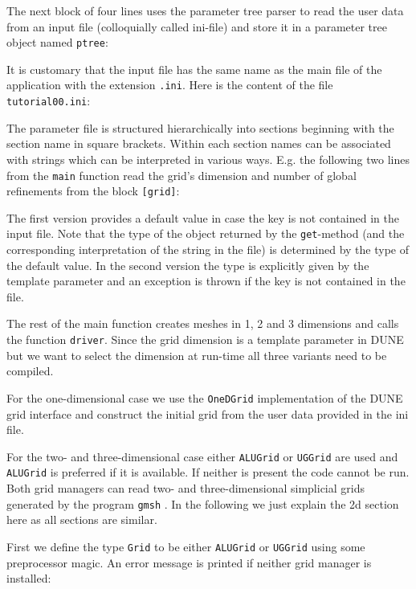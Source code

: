 \documentclass[a4paper,12pt]{article}
\begin{document}
The next block of four lines uses the parameter tree parser to
read the user data from an input file (colloquially called ini-file)
and store it in a parameter tree object
named \lstinline{ptree}:

It is customary that the input file has the same name as the 
main file of the application with the extension \lstinline{.ini}.
Here is the content of the file \lstinline{tutorial00.ini}:

The parameter file is structured hierarchically into 
sections beginning with the section name in square brackets.
Within each section names can be associated with strings which
can be interpreted in various ways. 
E.g. the following two lines from the \lstinline{main} function read the grid's
dimension and number of global refinements from the block \lstinline{[grid]}:

The first version provides a default value in case the key is not
contained in the input file. Note that the type of the object returned by the 
\lstinline{get}-method (and the corresponding interpretation of the string in the
file) is determined by the type of the default value. In the second version
the type is explicitly given by the template parameter and an exception
is thrown if the key is not contained in the file.

The rest of the main function creates meshes in 1, 2 and 3 dimensions
and calls the function \lstinline{driver}. Since the grid dimension is a template
parameter in DUNE but we want to select the dimension at run-time all three variants
need to be compiled. 

For the one-dimensional case we use the \lstinline{OneDGrid} implementation
of the DUNE grid interface and construct the initial grid from the user data
provided in the ini file.

For the two- and three-dimensional case either \lstinline{ALUGrid} or
\lstinline{UGGrid} are used and \lstinline{ALUGrid} is preferred if it is available. 
If neither is present the code cannot be run.
Both grid managers can read two- and three-dimensional simplicial
grids generated by the program \lstinline{gmsh} \cite{NME:NME2579}.
In the following we just explain the 2d section here as all sections are similar.

First we define the type \lstinline{Grid} to be either
\lstinline{ALUGrid} or \lstinline{UGGrid} using some
preprocessor magic. An error message is printed if neither
grid manager is installed:

\end{document}
